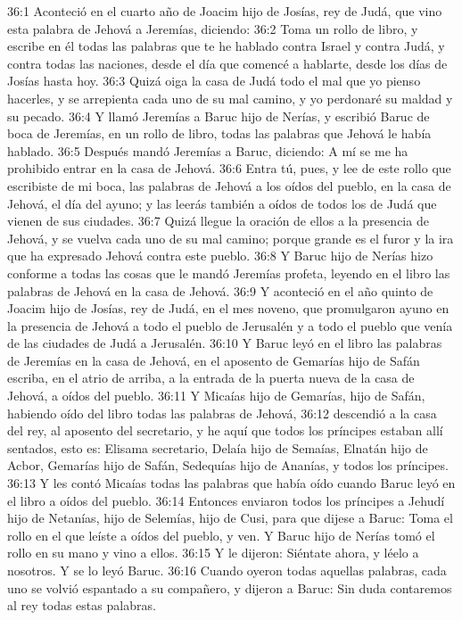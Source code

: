 36:1 Aconteció en el cuarto año de Joacim hijo de Josías, rey de Judá, que vino esta palabra de Jehová a Jeremías, diciendo: 
36:2 Toma un rollo de libro, y escribe en él todas las palabras que te he hablado contra Israel y contra Judá, y contra todas las naciones, desde el día que comencé a hablarte, desde los días de Josías hasta hoy. 
36:3 Quizá oiga la casa de Judá todo el mal que yo pienso hacerles, y se arrepienta cada uno de su mal camino, y yo perdonaré su maldad y su pecado. 
36:4 Y llamó Jeremías a Baruc hijo de Nerías, y escribió Baruc de boca de Jeremías, en un rollo de libro, todas las palabras que Jehová le había hablado. 
36:5 Después mandó Jeremías a Baruc, diciendo: A mí se me ha prohibido entrar en la casa de Jehová. 
36:6 Entra tú, pues, y lee de este rollo que escribiste de mi boca, las palabras de Jehová a los oídos del pueblo, en la casa de Jehová, el día del ayuno; y las leerás también a oídos de todos los de Judá que vienen de sus ciudades. 
36:7 Quizá llegue la oración de ellos a la presencia de Jehová, y se vuelva cada uno de su mal camino; porque grande es el furor y la ira que ha expresado Jehová contra este pueblo. 
36:8 Y Baruc hijo de Nerías hizo conforme a todas las cosas que le mandó Jeremías profeta, leyendo en el libro las palabras de Jehová en la casa de Jehová. 
36:9 Y aconteció en el año quinto de Joacim hijo de Josías, rey de Judá, en el mes noveno, que promulgaron ayuno en la presencia de Jehová a todo el pueblo de Jerusalén y a todo el pueblo que venía de las ciudades de Judá a Jerusalén. 
36:10 Y Baruc leyó en el libro las palabras de Jeremías en la casa de Jehová, en el aposento de Gemarías hijo de Safán escriba, en el atrio de arriba, a la entrada de la puerta nueva de la casa de Jehová, a oídos del pueblo. 
36:11 Y Micaías hijo de Gemarías, hijo de Safán, habiendo oído del libro todas las palabras de Jehová, 
36:12 descendió a la casa del rey, al aposento del secretario, y he aquí que todos los príncipes estaban allí sentados, esto es: Elisama secretario, Delaía hijo de Semaías, Elnatán hijo de Acbor, Gemarías hijo de Safán, Sedequías hijo de Ananías, y todos los príncipes. 
36:13 Y les contó Micaías todas las palabras que había oído cuando Baruc leyó en el libro a oídos del pueblo. 
36:14 Entonces enviaron todos los príncipes a Jehudí hijo de Netanías, hijo de Selemías, hijo de Cusi, para que dijese a Baruc: Toma el rollo en el que leíste a oídos del pueblo, y ven. Y Baruc hijo de Nerías tomó el rollo en su mano y vino a ellos. 
36:15 Y le dijeron: Siéntate ahora, y léelo a nosotros. Y se lo leyó Baruc. 
36:16 Cuando oyeron todas aquellas palabras, cada uno se volvió espantado a su compañero, y dijeron a Baruc: Sin duda contaremos al rey todas estas palabras. 

